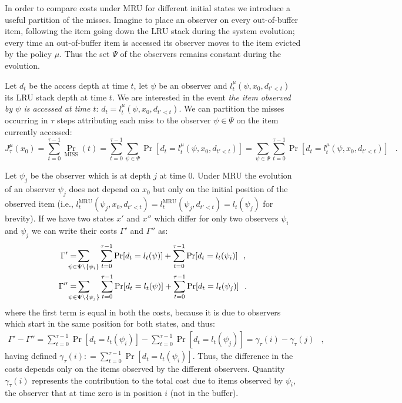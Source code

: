 \documentclass[11pt,a4paper]{article}
\DeclareMathOperator{\Pb}{Pr}
\DeclareMathOperator{\miss}{MISS}
\DeclareMathOperator{\mru}{MRU}
\DeclareMathOperator{\mf}{\enspace .}
\DeclareMathOperator{\mc}{\enspace ,}
\newcommand{\deq}{\mathrel{\mathop:}=}
\theoremstyle{definition}
\theoremstyle{remark}
\begin{document}
In order to compare costs under MRU for different initial states we introduce a
useful partition of the misses.  Imagine to place an observer on every
out-of-buffer item, following the item going down the LRU stack during the
system evolution; every time an out-of-buffer item is accessed its observer
moves to the item evicted by the policy $\mu$. Thus the set $\Psi$ of the
observers remains constant during the evolution.

Let $d_t$ be the access depth at time $t$, let $\psi$ be an observer
and $l_t^\mu\left(\psi,x_0,d_{t'<t}\right)$ its LRU stack depth at
time $t$. We are interested in the event \emph{the item observed by
$\psi$ is accessed at time $t$}:
$d_t=l_t^\mu\left(\psi,x_0,d_{t'<t}\right)$.  We can partition the
misses occurring in $\tau$ steps attributing each miss to the observer
$\psi\in\Psi$ on the item currently accessed:
\begin{equation}
  J_{\tau}^\mu(x_0)=\sum_{t=0}^{\tau-1}\Pb_{\miss}(t)=\sum_{t=0}^{\tau-1}
  \sum_{\psi\in\Psi}\Pb[d_t=l_t^\mu(\psi,x_0,d_{t'<t})]=
  \sum_{\psi\in\Psi}\sum_{t=0}^{\tau-1}\Pb[d_t=l_t^\mu(\psi,x_0,d_{t'<t})] \mf
\end{equation}

Let $\psi_j$ be the observer which is at depth $j$ at time 0.  Under
MRU the evolution of an observer $\psi_j$ does not depend on $x_0$ but
only on the initial position of the observed item (i.e.,
$l_t^{\mru}(\psi_j,x_0,d_{t'<t}) =
l_t^{\mru}(\psi_j,d_{t'<t})=l_t(\psi_j)$ for brevity).
If we have two states $x'$ and $x''$ which differ for only two observers
$\psi_i$ and $\psi_j$ we can write their costs $\Gamma'$ and $\Gamma''$ as:
\begin{equation}\begin{split}
    \Gamma'&=\hspace{-1.3em}\sum_{\psi\in\Psi\setminus\{\psi_i\}}
    \sum_{t=0}^{\tau-1}\Pb[d_t=l_t(\psi)]+
    \sum_{t=0}^{\tau-1}\Pb[d_t=l_t(\psi_i)] \mc\\
    \Gamma''&=\hspace{-1.3em}\sum_{\psi\in\Psi\setminus\{\psi_j\}}
    \sum_{t=0}^{\tau-1}\Pb[d_t=l_t(\psi)]+
    \sum_{t=0}^{\tau-1}\Pb[d_t=l_t(\psi_j)] \mf\\
  \end{split}\end{equation}
where the first term is equal in both the costs, because it is due to observers
which start in the same position for both states, and thus:
\begin{equation}\begin{split}
  \Gamma'-\Gamma''=
  \sum_{t=0}^{\tau-1}\Pb[d_t=l_t(\psi_i)]-\sum_{t=0}^{\tau-1}\Pb[d_t=l_t(\psi_j)]=
  \gamma_\tau(i)-\gamma_\tau(j) \mc
  \end{split}\end{equation}
having defined $\gamma_\tau(i)\deq\sum_{t=0}^{\tau-1}\Pb[d_t=l_t(\psi_i)]$. Thus,
the difference in the costs depends only on the items observed by the
different observers.
Quantity $\gamma_\tau(i)$ represents the contribution to the total cost due to
items observed by \(\psi_i\), the observer that at time zero is in position $i$
(not in the buffer).
\end{document}

